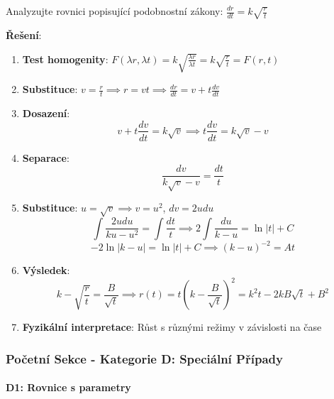 \begin{example}
Analyzujte rovnici popisující podobnostní zákony: $\frac{dr}{dt} = k\sqrt{\frac{r}{t}}$
\vspace{0.3\baselineskip}

\textbf{Řešení}: 
\begin{enumerate}
\item \textbf{Test homogenity}: $F(\lambda r, \lambda t) = k\sqrt{\frac{\lambda r}{\lambda t}} = k\sqrt{\frac{r}{t}} = F(r,t)$

\item \textbf{Substituce}: $v = \frac{r}{t} \implies r = vt \implies \frac{dr}{dt} = v + t\frac{dv}{dt}$

\item \textbf{Dosazení}:
\[
v + t\frac{dv}{dt} = k\sqrt{v} \implies t\frac{dv}{dt} = k\sqrt{v} - v
\]

\item \textbf{Separace}:
\[
\frac{dv}{k\sqrt{v} - v} = \frac{dt}{t}
\]

\item \textbf{Substituce}: $u = \sqrt{v} \implies v = u^2$, $dv = 2u  du$
\[
\int \frac{2u  du}{ku - u^2} = \int \frac{dt}{t} \implies 2\int \frac{du}{k - u} = \ln|t| + C
\]
\[
-2\ln|k - u| = \ln|t| + C \implies (k - u)^{-2} = At
\]

\item \textbf{Výsledek}:
\[
k - \sqrt{\frac{r}{t}} = \frac{B}{\sqrt{t}} \implies r(t) = t\left(k - \frac{B}{\sqrt{t}}\right)^2 = k^2t - 2kB\sqrt{t} + B^2
\]

\item \textbf{Fyzikální interpretace}: Růst s různými režimy v závislosti na čase
\end{enumerate}
\end{example}

\vspace{0.8\baselineskip}

\subsubsection{Početní Sekce - Kategorie D: Speciální Případy}
\label{subsubsec:pocetni-kategorie-d-homog}

\paragraph*{D1: Rovnice s parametry}

